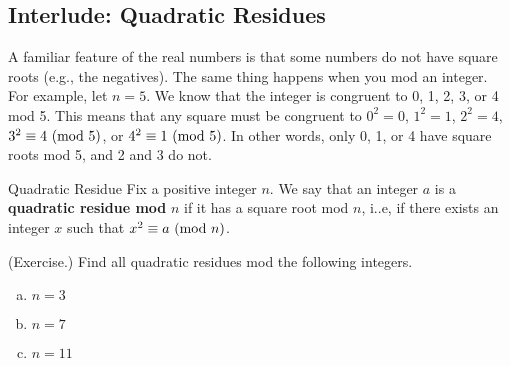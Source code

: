 \documentclass[letterpaper]{article}
\begin{document}
\subsection{Interlude: Quadratic Residues}
A familiar feature of the real numbers is that some numbers do not have square roots (e.g., the negatives). The same thing happens when you mod an integer. For example, let $n = 5$. We know that the integer is congruent to 0, 1, 2, 3, or 4 mod 5. This means that any square must be congruent to $0^2 = 0$, $1^2 = 1$, $2^2 = 4$, $3^2 \equiv 4 \ (\mathrm{mod}\ 5)$, or $4^2 \equiv 1 \ (\mathrm{mod}\ 5)$. In other words, only 0, 1, or 4 have square roots mod 5, and 2 and 3 do not.

\begin{definition}{Quadratic Residue}{}
    Fix a positive integer $n$. We say that an integer $a$ is a \textbf{quadratic residue mod }$n$ if it has a square root mod $n$, i..e, if there exists an integer $x$ such that $x^2 \equiv a \ (\mathrm{mod}\ n)$. 
\end{definition}

\begin{mdframed}
    (Exercise.) Find all quadratic residues mod the following integers. 
    \begin{enumerate}[(a)]
        \item $n = 3$
        \begin{mdframed}
            
        \end{mdframed}
        \item $n = 7$
        \begin{mdframed}
            
        \end{mdframed}
        \item $n = 11$
        \begin{mdframed}
            
        \end{mdframed}
    \end{enumerate}
\end{mdframed}
\end{document}
